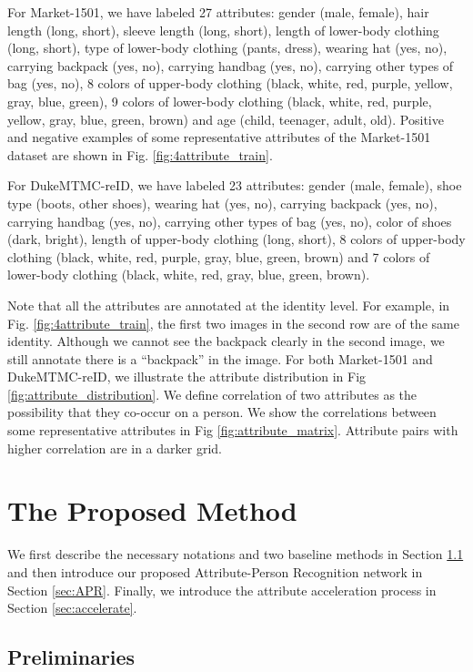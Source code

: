\documentclass[5p,times,twocolumn]{elsarticle}
\begin{document}
For Market-1501, we have labeled 27 attributes: gender (male, female), hair length (long, short), sleeve length (long,  short), length of lower-body clothing (long,  short), type of lower-body clothing (pants, dress), wearing hat (yes, no), carrying backpack (yes, no), carrying handbag (yes, no), carrying other types of bag (yes, no), 8 colors of upper-body clothing (black, white, red, purple, yellow, gray, blue, green), 9 colors of lower-body clothing (black, white, red, purple, yellow, gray, blue, green, brown) and age (child, teenager, adult, old). Positive and negative examples of some representative attributes of the Market-1501 dataset are shown in Fig. \ref{fig:4attribute_train}.
    
For DukeMTMC-reID, we have labeled 23 attributes: gender (male, female), shoe type (boots, other shoes), wearing hat (yes, no), carrying backpack (yes, no), carrying handbag (yes, no), carrying other types of bag (yes, no), color of shoes (dark, bright), length of upper-body clothing (long, short), 8 colors of upper-body clothing (black, white, red, purple, gray, blue, green, brown) and 7 colors of lower-body clothing (black, white, red, gray, blue, green, brown). 
    
Note that all the attributes are annotated at the identity level. For example, in Fig. \ref{fig:4attribute_train}, the first two images in the second row are of the same identity. Although we cannot see the backpack clearly in the second image, we still annotate there is a ``backpack'' in the image.
For both Market-1501 and DukeMTMC-reID, we illustrate the attribute distribution in Fig \ref{fig:attribute_distribution}. 
We define correlation of two attributes as the possibility that they co-occur on a person.
We show the correlations between some representative attributes in Fig \ref{fig:attribute_matrix}. Attribute pairs with higher correlation are in a darker grid.

\section{The Proposed Method}
We first describe the necessary notations and two baseline methods in Section \ref{sec:Preliminaries} and then introduce our proposed Attribute-Person Recognition network in Section \ref{sec:APR}. Finally, we introduce the attribute acceleration process in Section \ref{sec:accelerate}.
    
\subsection{Preliminaries}\label{sec:Preliminaries}
\end{document}
